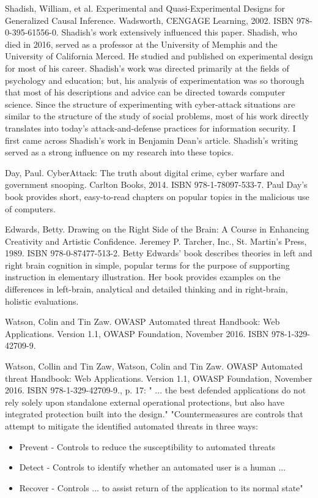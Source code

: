 Shadish, William, et al. Experimental and Quasi-Experimental Designs for Generalized Causal Inference. Wadsworth, CENGAGE Learning, 2002. ISBN 978-0-395-61556-0. Shadish's work extensively influenced this paper. Shadish, who died in 2016, served as a professor at the University of Memphis and the University of California Merced. He studied and published on experimental design for most of his career. Shadish's work was directed primarily at the fields of psychology and education; but, his analysis of experimentation was so thorough that most of his descriptions and advice can be directed towards computer science. Since the structure of experimenting with cyber-\gls{attack} situations are similar to the structure of the study of social problems, most of his work directly translates into today's \gls{attack}-and-defense practices for information security. I first came across Shadish's work in Benjamin Dean's article. Shadish's writing served as a strong influence on my research into these topics.

Day, Paul. CyberAttack: The truth about digital crime, cyber warfare and government snooping. Carlton Books, 2014. ISBN 978-1-78097-533-7. Paul Day's book provides short, easy-to-read chapters on popular topics in the malicious use of computers.

Edwards, Betty. Drawing on the Right Side of the Brain: A Course in Enhancing Creativity and Artistic Confidence. Jeremey P. Tarcher, Inc., St. Martin's Press, 1989. ISBN 978-0-87477-513-2. Betty Edwards' book describes theories in left and right brain cognition in simple, popular terms for the purpose of supporting instruction in elementary illustration. Her book provides examples on the differences in left-brain, analytical and detailed thinking and in right-brain, holistic evaluations.

Watson, Colin and Tin Zaw. OWASP Automated \gls{threat} Handbook: Web Applications. Version 1.1, OWASP Foundation, November 2016. ISBN 978-1-329-42709-9.

Watson, Collin and Tin Zaw, Watson, Colin and Tin Zaw. OWASP Automated \gls{threat} Handbook: Web Applications. Version 1.1, OWASP Foundation, November 2016. ISBN 978-1-329-42709-9., p. 17: " ... the best defended applications do not rely solely upon standalone external operational protections, but also have integrated protection built into the design." "Countermeasures are controls that attempt to mitigate the identified automated threats in three ways: \begin{itemize} \item Prevent - Controls to reduce the susceptibility to automated threats \item Detect - Controls to identify whether an automated user is a human ... \item Recover - Controls ... to assist return of the application to its normal state" \end{itemize}

